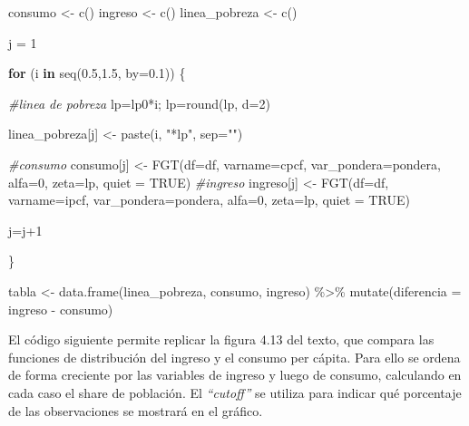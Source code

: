 \documentclass[
]{book}
\newenvironment{Shaded}{\begin{snugshade}}{\end{snugshade}}
\newcommand{\AttributeTok}[1]{\textcolor[rgb]{0.77,0.63,0.00}{#1}}
\newcommand{\CommentTok}[1]{\textcolor[rgb]{0.56,0.35,0.01}{\textit{#1}}}
\newcommand{\ConstantTok}[1]{\textcolor[rgb]{0.00,0.00,0.00}{#1}}
\newcommand{\ControlFlowTok}[1]{\textcolor[rgb]{0.13,0.29,0.53}{\textbf{#1}}}
\newcommand{\DecValTok}[1]{\textcolor[rgb]{0.00,0.00,0.81}{#1}}
\newcommand{\FloatTok}[1]{\textcolor[rgb]{0.00,0.00,0.81}{#1}}
\newcommand{\FunctionTok}[1]{\textcolor[rgb]{0.00,0.00,0.00}{#1}}
\newcommand{\NormalTok}[1]{#1}
\newcommand{\OtherTok}[1]{\textcolor[rgb]{0.56,0.35,0.01}{#1}}
\newcommand{\SpecialCharTok}[1]{\textcolor[rgb]{0.00,0.00,0.00}{#1}}
\newcommand{\StringTok}[1]{\textcolor[rgb]{0.31,0.60,0.02}{#1}}
\begin{document}
\begin{Shaded}
\begin{Highlighting}[]
\NormalTok{consumo }\OtherTok{\textless{}{-}} \FunctionTok{c}\NormalTok{()}
\NormalTok{ingreso }\OtherTok{\textless{}{-}} \FunctionTok{c}\NormalTok{()}
\NormalTok{linea\_pobreza }\OtherTok{\textless{}{-}} \FunctionTok{c}\NormalTok{()}

\NormalTok{j }\OtherTok{=} \DecValTok{1}

\ControlFlowTok{for}\NormalTok{ (i }\ControlFlowTok{in} \FunctionTok{seq}\NormalTok{(}\FloatTok{0.5}\NormalTok{,}\FloatTok{1.5}\NormalTok{, }\AttributeTok{by=}\FloatTok{0.1}\NormalTok{)) \{}
  
  \CommentTok{\#linea de pobreza}
\NormalTok{  lp}\OtherTok{=}\NormalTok{lp0}\SpecialCharTok{*}\NormalTok{i; lp}\OtherTok{=}\FunctionTok{round}\NormalTok{(lp, }\AttributeTok{d=}\DecValTok{2}\NormalTok{)}
  
\NormalTok{  linea\_pobreza[j] }\OtherTok{\textless{}{-}} \FunctionTok{paste}\NormalTok{(i, }\StringTok{"*lp"}\NormalTok{, }\AttributeTok{sep=}\StringTok{""}\NormalTok{)}

  \CommentTok{\#consumo}
\NormalTok{  consumo[j] }\OtherTok{\textless{}{-}} \FunctionTok{FGT}\NormalTok{(}\AttributeTok{df=}\NormalTok{df, }\AttributeTok{varname=}\NormalTok{cpcf, }\AttributeTok{var\_pondera=}\NormalTok{pondera, }\AttributeTok{alfa=}\DecValTok{0}\NormalTok{, }\AttributeTok{zeta=}\NormalTok{lp, }\AttributeTok{quiet =} \ConstantTok{TRUE}\NormalTok{)}
  \CommentTok{\#ingreso}
\NormalTok{  ingreso[j] }\OtherTok{\textless{}{-}} \FunctionTok{FGT}\NormalTok{(}\AttributeTok{df=}\NormalTok{df, }\AttributeTok{varname=}\NormalTok{ipcf, }\AttributeTok{var\_pondera=}\NormalTok{pondera, }\AttributeTok{alfa=}\DecValTok{0}\NormalTok{, }\AttributeTok{zeta=}\NormalTok{lp, }\AttributeTok{quiet =} \ConstantTok{TRUE}\NormalTok{)  }
  
\NormalTok{  j}\OtherTok{=}\NormalTok{j}\SpecialCharTok{+}\DecValTok{1}
  
\NormalTok{\}}

\NormalTok{tabla }\OtherTok{\textless{}{-}} \FunctionTok{data.frame}\NormalTok{(linea\_pobreza, consumo, ingreso) }\SpecialCharTok{\%\textgreater{}\%} \FunctionTok{mutate}\NormalTok{(}\AttributeTok{diferencia =}\NormalTok{ ingreso }\SpecialCharTok{{-}}\NormalTok{ consumo)}
\end{Highlighting}
\end{Shaded}

El código siguiente permite replicar la figura 4.13 del texto, que compara las funciones de distribución del ingreso y el consumo per cápita. Para ello se ordena de forma creciente por las variables de ingreso y luego de consumo, calculando en cada caso el share de población. El \emph{``cutoff''} se utiliza para indicar qué porcentaje de las observaciones se mostrará en el gráfico.
\end{document}
